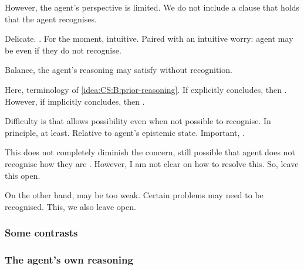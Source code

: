 \begin{note}
  However, the agent's perspective is limited.
  We do not include a clause that holds that the agent recognises.

  Delicate.
  .
  For the moment, intuitive.
  Paired with an intuitive worry: agent may be \committed{} even if they do not recognise.

  Balance, the agent's reasoning may satisfy without recognition.

  Here,  terminology of \ref{idea:CS:B:prior-reasoning}.
  If explicitly concludes, then .
  However, if implicitly concludes, then .

  Difficulty is that \commitment{} allows possibility even when not possible to recognise.
  In principle, at least.
  Relative to agent's epistemic state.
  Important, \ep{}.

  This does not completely diminish the concern, still possible that agent does not recognise how they are \committed{}.
  However, I am not clear on how to resolve this.
  So, leave this open.

  On the other hand,  may be too weak.
  Certain problems may need to be recognised.
  This, we also leave open.
\end{note}

\subsubsection{Some contrasts}
\label{sec:some-contrasts}


\subsubsection{The agent's own reasoning}
\label{sec:agents-own-reasoning}


